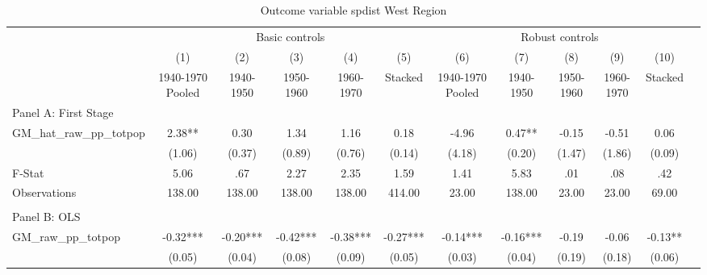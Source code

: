  \begin{table}[htbp]\centering {} \begin{threeparttable} \caption{Outcome variable spdist West Region} \begin{tabular}{l*{11}{c}} \toprule
          &\multicolumn{5}{c}{Basic controls}                                   &\multicolumn{5}{c}{Robust controls}                                  \\\cmidrule(lr){2-6}\cmidrule(lr){7-11}
          &\multicolumn{1}{c}{(1)}&\multicolumn{1}{c}{(2)}&\multicolumn{1}{c}{(3)}&\multicolumn{1}{c}{(4)}&\multicolumn{1}{c}{(5)}&\multicolumn{1}{c}{(6)}&\multicolumn{1}{c}{(7)}&\multicolumn{1}{c}{(8)}&\multicolumn{1}{c}{(9)}&\multicolumn{1}{c}{(10)}\\
          &\multicolumn{1}{c}{1940-1970 Pooled}&\multicolumn{1}{c}{1940-1950}&\multicolumn{1}{c}{1950-1960}&\multicolumn{1}{c}{1960-1970}&\multicolumn{1}{c}{Stacked}&\multicolumn{1}{c}{1940-1970 Pooled}&\multicolumn{1}{c}{1940-1950}&\multicolumn{1}{c}{1950-1960}&\multicolumn{1}{c}{1960-1970}&\multicolumn{1}{c}{Stacked}\\
\cmidrule(lr){1-11}
\multicolumn{10}{l}{Panel A: First Stage}\\
\cmidrule(lr){1-11}
GM\_hat\_raw\_pp\_totpop&      2.38** &      0.30   &      1.34   &      1.16   &      0.18   &     -4.96   &      0.47** &     -0.15   &     -0.51   &      0.06   \\
          &    (1.06)   &    (0.37)   &    (0.89)   &    (0.76)   &    (0.14)   &    (4.18)   &    (0.20)   &    (1.47)   &    (1.86)   &    (0.09)   \\
\midrule
F-Stat    &      5.06   &       .67   &      2.27   &      2.35   &      1.59   &      1.41   &      5.83   &       .01   &       .08   &       .42   \\
Observations&    138.00   &    138.00   &    138.00   &    138.00   &    414.00   &     23.00   &    138.00   &     23.00   &     23.00   &     69.00   \\
\cmidrule[\heavyrulewidth](lr){1-11} \\ \cmidrule[\heavyrulewidth](lr){1-11}
\multicolumn{10}{l}{Panel B: OLS}\\
\cmidrule(lr){1-11}
GM\_raw\_pp\_totpop&     -0.32***&     -0.20***&     -0.42***&     -0.38***&     -0.27***&     -0.14***&     -0.16***&     -0.19   &     -0.06   &     -0.13** \\
          &    (0.05)   &    (0.04)   &    (0.08)   &    (0.09)   &    (0.05)   &    (0.03)   &    (0.04)   &    (0.19)   &    (0.18)   &    (0.06)   \\

\end{tabular}
\end{threeparttable}
\end{table}
